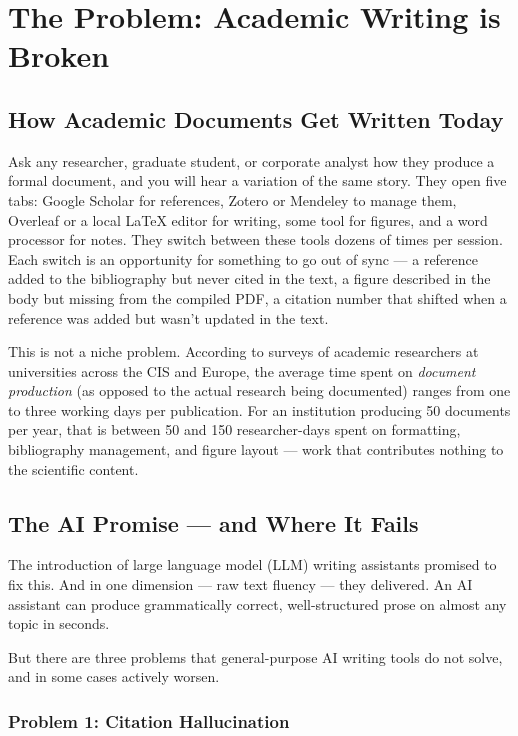 \section{The Problem: Academic Writing is Broken}
\label{sec:problem}

\subsection{How Academic Documents Get Written Today}

Ask any researcher, graduate student, or corporate analyst how they produce a
formal document, and you will hear a variation of the same story.
They open five tabs: Google Scholar for references, Zotero or Mendeley to manage them,
Overleaf or a local \LaTeX{} editor for writing, some tool for figures, and a word
processor for notes.
They switch between these tools dozens of times per session.
Each switch is an opportunity for something to go out of sync — a reference added
to the bibliography but never cited in the text, a figure described in the body
but missing from the compiled PDF, a citation number that shifted when a reference
was added but wasn't updated in the text.

This is not a niche problem.
According to surveys of academic researchers at universities across the CIS and Europe,
the average time spent on \emph{document production} (as opposed to the actual
research being documented) ranges from one to three working days per publication.
For an institution producing 50 documents per year, that is between 50 and 150
researcher-days spent on formatting, bibliography management, and figure layout —
work that contributes nothing to the scientific content.

\subsection{The AI Promise — and Where It Fails}

The introduction of large language model (LLM) writing assistants promised to fix this.
And in one dimension — raw text fluency — they delivered.
An AI assistant can produce grammatically correct, well-structured prose on almost
any topic in seconds.

But there are three problems that general-purpose AI writing tools do not solve,
and in some cases actively worsen.

\subsubsection*{Problem 1: Citation Hallucination}

